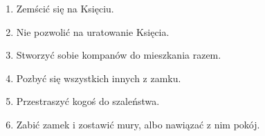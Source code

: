 			{
				\begin{enumerate}[noitemsep]
					\item Zemścić się na Księciu.
					\item Nie pozwolić na uratowanie Księcia.
					\item Stworzyć sobie kompanów do mieszkania razem.
					\item Pozbyć się wszystkich innych z zamku.
					\item Przestraszyć kogoś do szaleństwa.
					\item Zabić zamek i zostawić mury, albo nawiązać z nim pokój.
				\end{enumerate}
			}
			{
			}
			{}
			{}

